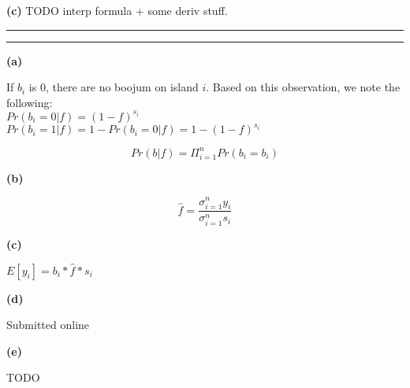 \documentclass[11pt,letterpaper]{article}
\newcommand{\question}[1] {\vspace{.25in} \hrule\vspace{0.5em}
\noindent{\bf #1} \vspace{0.5em}
\hrule \vspace{.10in}}
\renewcommand{\part}[1] {\vspace{.10in} {\bf (#1)}}
\begin{document}
\part{c}
TODO interp formula + some deriv stuff.

\question{4}
\part{a}

If $b_i$ is 0, there are no boojum on island $i$. Based on this observation, we note the following:\\
$Pr(b_i = 0| f) = (1-f)^{s_i}$\\
$Pr(b_i = 1| f) = 1 - Pr(b_i = 0 | f) = 1 - (1-f)^{s_i}$

$$Pr(b | f) = \Pi_{i=1}^n Pr(b_i = b_i)$$

\part{b}

$$\hat{f} = \frac{\sigma_{i=1}^n y_i}{\sigma_{i=1}^n s_i} $$

\part{c}

$E[y_i] = b_i * \hat{f} * s_i$

\part{d}

Submitted online

\part{e}

TODO
\end{document}
